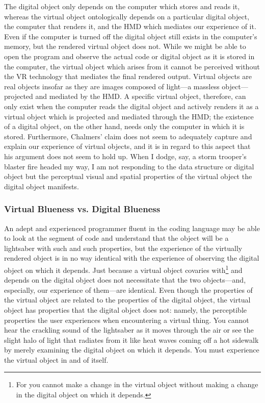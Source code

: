 \documentclass{article}
\begin{document}
The digital object only depends on the computer which stores and reads it, whereas the virtual object ontologically depends on a particular digital object, the computer that renders it, and the HMD which mediates our experience of it. Even if the computer is turned off the digital object still exists in the computer’s memory, but the rendered virtual object does not. While we might be able to open the program and observe the actual code or digital object as it is stored in the computer, the virtual object which arises from it cannot be perceived without the VR technology that mediates the final rendered output. Virtual objects are real objects insofar as they are images composed of light—a massless object—projected and mediated by the HMD. A specific virtual object, therefore, can only exist when the computer reads the digital object and actively renders it as a virtual object which is projected and mediated through the HMD; the existence of a digital object, on the other hand, needs only the computer in which it is stored. Furthermore, Chalmers’ claim does not seem to adequately capture and explain our experience of virtual objects, and it is in regard to this aspect that his argument does not seem to hold up. When I dodge, say, a storm trooper’s blaster fire headed my way, I am not responding to the data structure or digital object but the perceptual visual and spatial properties of the virtual object the digital object manifests.

\subsubsection*{Virtual Blueness vs. Digital Blueness}

An adept and experienced programmer fluent in the coding language may be able to look at the segment of code and understand that the object will be a lightsaber with such and such properties, but the experience of the virtually rendered object is in no way identical with the experience of observing the digital object on which it depends. Just because a virtual object covaries with\footnote{For you cannot make a change in the virtual object without making a change in the digital object on which it depends.} and depends on the digital object does not necessitate that the two objects—and, especially, our experience of them—are identical. Even though the properties of the virtual object are related to the properties of the digital object, the virtual object has properties that the digital object does not: namely, the perceptible properties the user experiences when encountering a virtual thing. You cannot hear the crackling sound of the lightsaber as it moves through the air or see the slight halo of light that radiates from it like heat waves coming off a hot sidewalk by merely examining the digital object on which it depends. You must experience the virtual object in and of itself.
\end{document}
